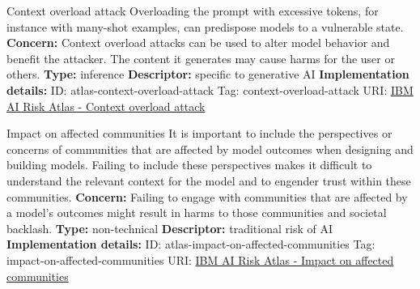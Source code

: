 \begin{definitionbox}{Context overload attack}
Overloading the prompt with excessive tokens, for instance with many-shot examples, can predispose models to a vulnerable state.\newline\newline
\textbf{Concern: }Context overload attacks can be used to alter model behavior and benefit the attacker. The content it generates may cause harms for the user or others.\newline\newline
\textbf{Type: }inference\newline
\textbf{Descriptor: }specific to generative AI \newline\newline
\textbf{Implementation details: } \newline
ID: atlas-context-overload-attack \newline
Tag: context-overload-attack \newline
URI:  \href{https://www.ibm.com/docs/en/watsonx/saas?topic=SSYOK8/wsj/ai-risk-atlas/context-overload-attack.html}{IBM AI Risk Atlas - Context overload attack}\newline
\end{definitionbox}
\begin{definitionbox}{Impact on affected communities}
It is important to include the perspectives or concerns of communities that are affected by model outcomes when designing and building models. Failing to include these perspectives makes it difficult to understand the relevant context for the model and to engender trust within these communities.\newline\newline
\textbf{Concern: }Failing to engage with communities that are affected by a model's outcomes might result in harms to those communities and societal backlash.\newline\newline
\textbf{Type: }non-technical\newline
\textbf{Descriptor: }traditional risk of AI \newline\newline
\textbf{Implementation details: } \newline
ID: atlas-impact-on-affected-communities \newline
Tag: impact-on-affected-communities \newline
URI:  \href{https://www.ibm.com/docs/en/watsonx/saas?topic=SSYOK8/wsj/ai-risk-atlas/impact-on-affected-communities.html}{IBM AI Risk Atlas - Impact on affected communities}\newline
\end{definitionbox}
